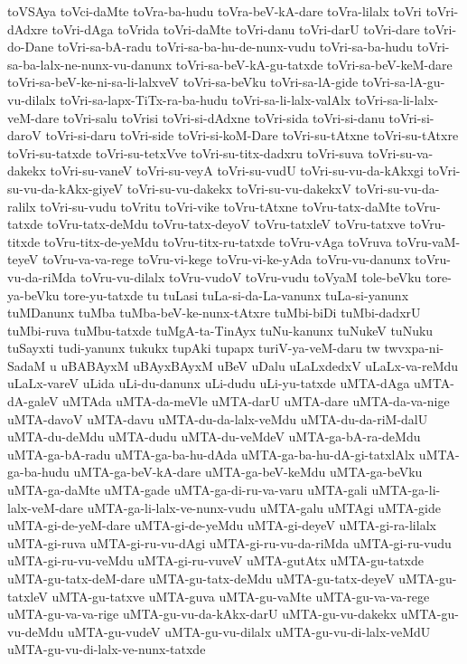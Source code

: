 {toVSAya
toVci-daMte
toVra-ba-hudu
toVra-beV-kA-dare
toVra-lilalx
toVri
toVri-dAdxre
toVri-dAga
toVrida
toVri-daMte
toVri-danu
toVri-darU
toVri-dare
toVri-do-Dane
toVri-sa-bA-radu
toVri-sa-ba-hu-de-nunx-vudu
toVri-sa-ba-hudu
toVri-sa-ba-lalx-ne-nunx-vu-danunx
toVri-sa-beV-kA-gu-tatxde
toVri-sa-beV-keM-dare
toVri-sa-beV-ke-ni-sa-li-lalxveV
toVri-sa-beVku
toVri-sa-lA-gide
toVri-sa-lA-gu-vu-dilalx
toVri-sa-lapx-TiTx-ra-ba-hudu
toVri-sa-li-lalx-valAlx
toVri-sa-li-lalx-veM-dare
toVri-salu
toVrisi
toVri-si-dAdxne
toVri-sida
toVri-si-danu
toVri-si-daroV
toVri-si-daru
toVri-side
toVri-si-koM-Dare
toVri-su-tAtxne
toVri-su-tAtxre
toVri-su-tatxde
toVri-su-tetxVve
toVri-su-titx-dadxru
toVri-suva
toVri-su-va-dakekx
toVri-su-vaneV
toVri-su-veyA
toVri-su-vudU
toVri-su-vu-da-kAkxgi
toVri-su-vu-da-kAkx-giyeV
toVri-su-vu-dakekx
toVri-su-vu-dakekxV
toVri-su-vu-da-ralilx
toVri-su-vudu
toVritu
toVri-vike
toVru-tAtxne
toVru-tatx-daMte
toVru-tatxde
toVru-tatx-deMdu
toVru-tatx-deyoV
toVru-tatxleV
toVru-tatxve
toVru-titxde
toVru-titx-de-yeMdu
toVru-titx-ru-tatxde
toVru-vAga
toVruva
toVru-vaM-teyeV
toVru-va-va-rege
toVru-vi-kege
toVru-vi-ke-yAda
toVru-vu-danunx
toVru-vu-da-riMda
toVru-vu-dilalx
toVru-vudoV
toVru-vudu
toVyaM
tole-beVku
tore-ya-beVku
tore-yu-tatxde
tu
tuLasi
tuLa-si-da-La-vanunx
tuLa-si-yanunx
tuMDanunx
tuMba
tuMba-beV-ke-nunx-tAtxre
tuMbi-biDi
tuMbi-dadxrU
tuMbi-ruva
tuMbu-tatxde
tuMgA-ta-TinAyx
tuNu-kanunx
tuNukeV
tuNuku
tuSayxti
tudi-yanunx
tukukx
tupAki
tupapx
turiV-ya-veM-daru
tw
twvxpa-ni-SadaM
u
uBABAyxM
uBAyxBAyxM
uBeV
uDalu
uLaLxdedxV
uLaLx-va-reMdu
uLaLx-vareV
uLida
uLi-du-danunx
uLi-dudu
uLi-yu-tatxde
uMTA-dAga
uMTA-dA-galeV
uMTAda
uMTA-da-meVle
uMTA-darU
uMTA-dare
uMTA-da-va-nige
uMTA-davoV
uMTA-davu
uMTA-du-da-lalx-veMdu
uMTA-du-da-riM-dalU
uMTA-du-deMdu
uMTA-dudu
uMTA-du-veMdeV
uMTA-ga-bA-ra-deMdu
uMTA-ga-bA-radu
uMTA-ga-ba-hu-dAda
uMTA-ga-ba-hu-dA-gi-tatxlAlx
uMTA-ga-ba-hudu
uMTA-ga-beV-kA-dare
uMTA-ga-beV-keMdu
uMTA-ga-beVku
uMTA-ga-daMte
uMTA-gade
uMTA-ga-di-ru-va-varu
uMTA-gali
uMTA-ga-li-lalx-veM-dare
uMTA-ga-li-lalx-ve-nunx-vudu
uMTA-galu
uMTAgi
uMTA-gide
uMTA-gi-de-yeM-dare
uMTA-gi-de-yeMdu
uMTA-gi-deyeV
uMTA-gi-ra-lilalx
uMTA-gi-ruva
uMTA-gi-ru-vu-dAgi
uMTA-gi-ru-vu-da-riMda
uMTA-gi-ru-vudu
uMTA-gi-ru-vu-veMdu
uMTA-gi-ru-vuveV
uMTA-gutAtx
uMTA-gu-tatxde
uMTA-gu-tatx-deM-dare
uMTA-gu-tatx-deMdu
uMTA-gu-tatx-deyeV
uMTA-gu-tatxleV
uMTA-gu-tatxve
uMTA-guva
uMTA-gu-vaMte
uMTA-gu-va-va-rege
uMTA-gu-va-va-rige
uMTA-gu-vu-da-kAkx-darU
uMTA-gu-vu-dakekx
uMTA-gu-vu-deMdu
uMTA-gu-vudeV
uMTA-gu-vu-dilalx
uMTA-gu-vu-di-lalx-veMdU
uMTA-gu-vu-di-lalx-ve-nunx-tatxde
}
